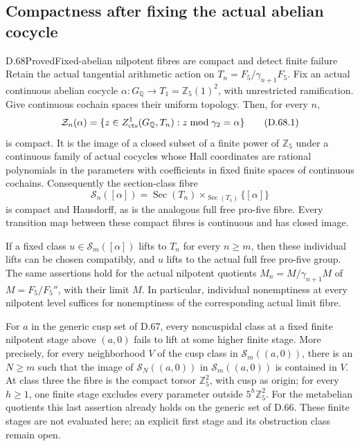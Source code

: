 \subsection{Compactness after fixing the actual abelian cocycle}

\begin{statement}{D.68}{Proved}{Fixed-abelian nilpotent fibres are compact and detect finite failure}
Retain the actual tangential arithmetic action on
\(T_n=F_5/\gamma_{n+1}F_5\). Fix an actual continuous
abelian cocycle
\(\alpha:G_{\mathbb Q}\to T_1=\mathbb Z_5(1)^2\),
with unrestricted ramification. Give continuous cochain
spaces their uniform topology. Then, for every \(n\),
\[
 \mathscr Z_n(\alpha)=
 \{z\in Z^1_{\rm cts}(G_{\mathbb Q},T_n):
                     z\bmod\gamma_2=\alpha\}
                                                        \tag{D.68.1}
\]
is compact. It is the image of a closed subset of a
finite power of \(\mathbb Z_5\) under a continuous
family of actual cocycles whose Hall coordinates
are rational polynomials in the parameters with
coefficients in fixed finite spaces of continuous
cochains. Consequently the section-class fibre
\[
 \mathscr S_n([\alpha])=
 \operatorname{Sec}(T_n)\mathbin{\times}_{\operatorname{Sec}(T_1)}
                                      \{[\alpha]\}
                                                        \tag{D.68.2}
\]
is compact and Hausdorff, as is the analogous full
free pro-five fibre. Every transition map between
these compact fibres is continuous and has closed
image.

If a fixed class \(u\in\mathscr S_m([\alpha])\)
lifts to \(T_n\) for every \(n\ge m\), then these
individual lifts can be chosen compatibly, and
\(u\) lifts to the actual full free pro-five group.
The same assertions hold for the actual nilpotent
quotients \(M_n=M/\gamma_{n+1}M\) of
\(M=F_5/F_5''\), with their limit \(M\).
In particular, individual nonemptiness at every
nilpotent level suffices for nonemptiness of the
corresponding actual limit fibre.

For \(a\) in the generic cusp set of D.67, every
noncuspidal class at a fixed finite nilpotent stage
above \((a,0)\) fails to lift at some higher finite
stage. More precisely, for every neighborhood \(V\)
of the cusp class in \(\mathscr S_m((a,0))\),
there is an \(N\ge m\) such that the image of
\(\mathscr S_N((a,0))\) in
\(\mathscr S_m((a,0))\) is contained in \(V\).
At class three the fibre is the compact torsor
\(\mathbb Z_5^2\), with cusp as origin; for every
\(h\ge1\), one finite stage excludes every
parameter outside \(5^h\mathbb Z_5^2\).
For the metabelian quotients this last assertion
already holds on the generic set of D.66.
These finite stages are not evaluated here; an
explicit first stage and its obstruction class
remain open.
\end{statement}

